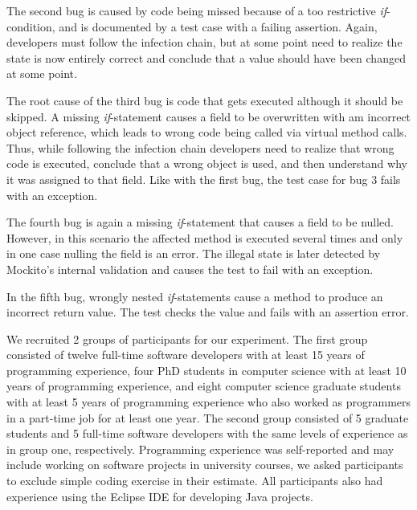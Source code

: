 \documentclass[
			english,
			]{elsarticle}
\begin{document}
The second bug is caused by code being missed because of a too restrictive \textit{if}-condition, and is documented by a test case with a failing assertion.
Again, developers must follow the infection chain, but at some point need to realize the state is now entirely correct and conclude that a value should have been changed at some point.

The root cause of the third bug is code that gets executed although it should be skipped.
A missing \textit{if}-statement causes a field to be overwritten with am incorrect object reference, which leads to wrong code being called via virtual method calls.
Thus, while following the infection chain developers need to realize that wrong code is executed, conclude that a wrong object is used, and then understand why it was assigned to that field.
Like with the first bug, the test case for bug 3 fails with an exception.

The fourth bug is again a missing \textit{if}-statement that causes a field to be nulled.
However, in this scenario the affected method is executed several times and only in one case nulling the field is an error.
The illegal state is later detected by Mockito's internal validation and causes the test to fail with an exception.

In the fifth bug, wrongly nested \textit{if}-statements cause a method to produce an incorrect return value.
The test checks the value and fails with an assertion error.

We recruited 2 groups of participants for our experiment.
The first group consisted of
twelve full-time software developers with at least 15 years of programming experience, 
four PhD students in computer science with at least 10 years of programming experience,
and eight computer science graduate students with at least 5 years of programming experience who also worked as programmers in a part-time job for at least one year.
The second group consisted of 5 graduate students and 5 full-time software developers with the same levels of experience as in group one, respectively.
Programming experience was self-reported and may include working on software projects in university courses, we asked participants to exclude simple coding exercise in their estimate.
All participants also had experience using the Eclipse IDE for developing Java projects.
\end{document}

